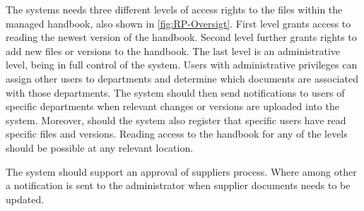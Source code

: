 The systems needs three different levels of access rights to the files within the managed handbook, also shown in \cref{fig:RP-Oversigt}.
First level grants access to reading the newest version of the handbook.
Second level further grants rights to add new files or versions to the handbook.
The last level is an administrative level, being in full control of the system.
Users with administrative privileges can assign other users to departments and determine which documents are associated with those departments.
The system should then send notifications to users of specific departments when relevant changes or versions are uploaded into the system.
Moreover, should the system also register that specific users have read specific files and versions.
Reading access to the handbook for any of the levels should be possible at any relevant location.

The system should support an approval of suppliers process.
Where among other a notification is sent to the administrator when supplier documents needs to be updated.

